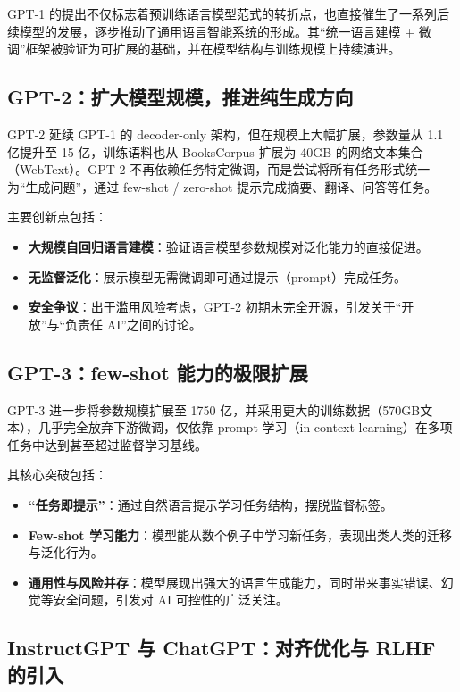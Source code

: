 \documentclass[a4paper,12pt]{article}
\begin{document}
GPT-1 的提出不仅标志着预训练语言模型范式的转折点，也直接催生了一系列后续模型的发展，逐步推动了通用语言智能系统的形成。其“统一语言建模 + 微调”框架被验证为可扩展的基础，并在模型结构与训练规模上持续演进。

\subsection{GPT-2：扩大模型规模，推进纯生成方向}

GPT-2 延续 GPT-1 的 decoder-only 架构，但在规模上大幅扩展，参数量从 1.1 亿提升至 15 亿，训练语料也从 BooksCorpus 扩展为 40GB 的网络文本集合（WebText）。GPT-2 不再依赖任务特定微调，而是尝试将所有任务形式统一为“生成问题”，通过 few-shot / zero-shot 提示完成摘要、翻译、问答等任务。

主要创新点包括：

\begin{itemize}
    \item \textbf{大规模自回归语言建模}：验证语言模型参数规模对泛化能力的直接促进。
    \item \textbf{无监督泛化}：展示模型无需微调即可通过提示（prompt）完成任务。
    \item \textbf{安全争议}：出于滥用风险考虑，GPT-2 初期未完全开源，引发关于“开放”与“负责任 AI”之间的讨论。
\end{itemize}

\subsection{GPT-3：few-shot 能力的极限扩展}

GPT-3 进一步将参数规模扩展至 1750 亿，并采用更大的训练数据（570GB文本），几乎完全放弃下游微调，仅依靠 prompt 学习（in-context learning）在多项任务中达到甚至超过监督学习基线。

其核心突破包括：

\begin{itemize}
    \item \textbf{“任务即提示”}：通过自然语言提示学习任务结构，摆脱监督标签。
    \item \textbf{Few-shot 学习能力}：模型能从数个例子中学习新任务，表现出类人类的迁移与泛化行为。
    \item \textbf{通用性与风险并存}：模型展现出强大的语言生成能力，同时带来事实错误、幻觉等安全问题，引发对 AI 可控性的广泛关注。
\end{itemize}

\subsection{InstructGPT 与 ChatGPT：对齐优化与 RLHF 的引入}
\end{document}
